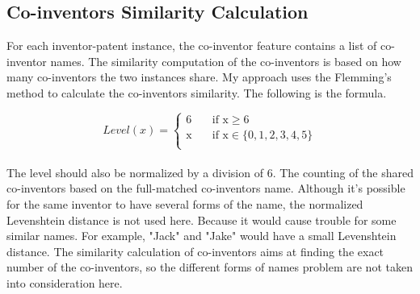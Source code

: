 \subsection{Co-inventors Similarity Calculation}
For each inventor-patent instance, the co-inventor feature contains a list of co-inventor names. The similarity computation of the co-inventors is based on how many co-inventors the two instances share. My approach uses the Flemming's method to calculate the co-inventors similarity. The following is the formula.

\[   
Level(x) = 
     \begin{cases}
       \text{6} &\quad\text{if x}\ge6\\
       \text{x} &\quad\text{if x} \in \{0,1,2,3,4,5\} \\
     \end{cases}
\]
\\

The level should also be normalized by a division of 6. The counting of the shared co-inventors based on the full-matched co-inventors name. Although it's possible for the same inventor to have several forms of the name, the normalized Levenshtein distance is not used here. Because it would cause trouble for some similar names. For example, "Jack" and "Jake" would have a small Levenshtein distance. The similarity calculation of co-inventors aims at finding the exact number of the co-inventors,  so the different forms of names problem are not taken into consideration here.

